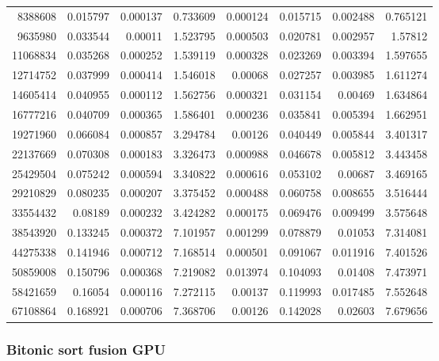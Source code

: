 \begin{longtable}{r r r r r r r r}
8388608 & 0.015797 & 0.000137 & 0.733609 & 0.000124 & 0.015715 & 0.002488 & 0.765121 \\
9635980 & 0.033544 & 0.00011 & 1.523795 & 0.000503 & 0.020781 & 0.002957 & 1.57812 \\
11068834 & 0.035268 & 0.000252 & 1.539119 & 0.000328 & 0.023269 & 0.003394 & 1.597655 \\
12714752 & 0.037999 & 0.000414 & 1.546018 & 0.00068 & 0.027257 & 0.003985 & 1.611274 \\
14605414 & 0.040955 & 0.000112 & 1.562756 & 0.000321 & 0.031154 & 0.00469 & 1.634864 \\
16777216 & 0.040709 & 0.000365 & 1.586401 & 0.000236 & 0.035841 & 0.005394 & 1.662951 \\
19271960 & 0.066084 & 0.000857 & 3.294784 & 0.00126 & 0.040449 & 0.005844 & 3.401317 \\
22137669 & 0.070308 & 0.000183 & 3.326473 & 0.000988 & 0.046678 & 0.005812 & 3.443458 \\
25429504 & 0.075242 & 0.000594 & 3.340822 & 0.000616 & 0.053102 & 0.00687 & 3.469165 \\
29210829 & 0.080235 & 0.000207 & 3.375452 & 0.000488 & 0.060758 & 0.008655 & 3.516444 \\
33554432 & 0.08189 & 0.000232 & 3.424282 & 0.000175 & 0.069476 & 0.009499 & 3.575648 \\
38543920 & 0.133245 & 0.000372 & 7.101957 & 0.001299 & 0.078879 & 0.01053 & 7.314081 \\
44275338 & 0.141946 & 0.000712 & 7.168514 & 0.000501 & 0.091067 & 0.011916 & 7.401526 \\
50859008 & 0.150796 & 0.000368 & 7.219082 & 0.013974 & 0.104093 & 0.01408 & 7.473971 \\
58421659 & 0.16054 & 0.000116 & 7.272115 & 0.00137 & 0.119993 & 0.017485 & 7.552648 \\
67108864 & 0.168921 & 0.000706 & 7.368706 & 0.00126 & 0.142028 & 0.02603 & 7.679656 \\
\end{longtable}

\subsubsection{Bitonic sort fusion GPU}

